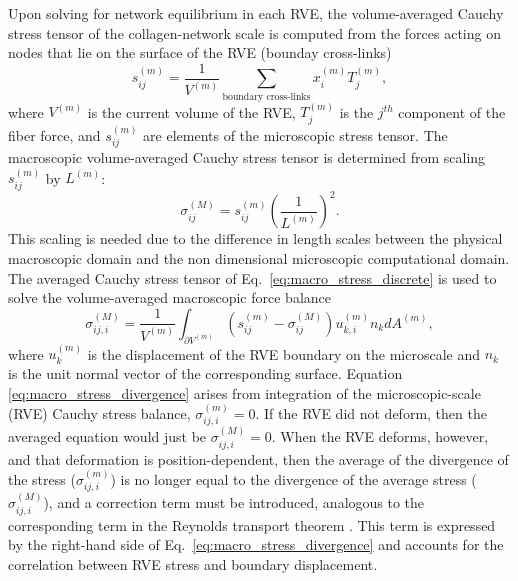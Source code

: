 \documentclass[]{interact}
\begin{document}
Upon solving for network equilibrium in each RVE, the volume-averaged Cauchy stress tensor of the collagen-network scale is computed from the forces acting on nodes that lie on the surface of the RVE (bounday cross-links) \citep{Chandran:2007hy}
%
\begin{equation}
s_{ij}^{(m)} = \frac{1}{V^{(m)}} \sum_{\text{boundary cross-links}} x_i^{(m)} T_j^{(m)} ,
\label{eq:micro_stress_discrete}
\end{equation}
%
where $V^{(m)}$ is the current volume of the RVE, $T_j^{(m)}$ is the $j^{th}$ component of the fiber force, and $s_{ij}^{(m)}$ are elements of the microscopic stress tensor. The macroscopic volume-averaged Cauchy stress tensor is determined from scaling $s_{ij}^{(m)}$ by  $L^{(m)}$:
%
\begin{equation}
\sigma_{ij}^{(M)} = s_{ij}^{(m)}\left(\frac{1}{L^{(m)}}\right)^2.
\label{eq:macro_stress_discrete}
\end{equation}
%
This scaling is needed due to the difference in length scales between the physical macroscopic domain and the non dimensional microscopic computational domain. The averaged Cauchy stress tensor of Eq.\ \eqref{eq:macro_stress_discrete} is used to solve the volume-averaged macroscopic force balance \citep{Chandran:2007hy}
%
\begin{equation}
\sigma_{ij,i}^{(M)} = \frac{1}{V^{(m)}} \int_{\partial V^{(m)}} \left( s_{ij}^{(m)} - \sigma_{ij}^{(M)} \right)u_{k,i}^{(m)} n_k dA^{(m)},
\label{eq:macro_stress_divergence}
\end{equation}
%
where $u_k^{(m)}$ is the displacement of the RVE boundary on the microscale and $n_k$ is the unit normal vector of the corresponding surface. Equation \eqref{eq:macro_stress_divergence} arises from integration of the microscopic-scale (RVE) Cauchy stress balance, $\sigma_{ij,i}^{(m)} = 0$. If the RVE did not deform, then the averaged equation would just be $\sigma^{(M)}_{ij,i}=0$. When the RVE deforms, however, and that deformation is position-dependent, then the average of the divergence of the stress ($\sigma_{ij,i}^{(m)}$) is no longer equal to the divergence of the average stress ($\sigma_{ij,i}^{(M)}$), and a correction term must be introduced, analogous to the corresponding term in the Reynolds transport theorem \citep{Whitaker-1999}. This term is expressed by the right-hand side of Eq.\ \eqref{eq:macro_stress_divergence} and accounts for the correlation between RVE stress and boundary displacement.

\end{document}

